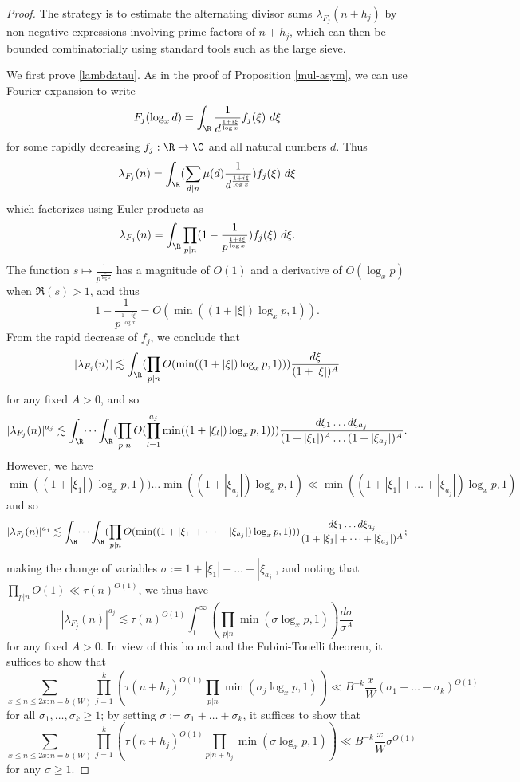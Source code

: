 \begin{proof}  The strategy is to estimate the alternating divisor sums $\lambda_{F_j}(n+h_j)$ by non-negative expressions involving prime factors of $n+h_j$, which can then be bounded combinatorially using standard tools such as the large sieve.

We first prove \eqref{lambdatau}.
As in the proof of Proposition \ref{mul-asym}, we can use Fourier expansion to write
$$ F_j( \log_x d ) = \int_\R \frac{1}{d^{\frac{1+i\xi}{\log x}}} f_j(\xi)\ d\xi$$
for some rapidly decreasing $f_j: \R \to \C$ and all natural numbers $d$.  Thus
$$ \lambda_{F_j}(n) = \int_\R (\sum_{d|n} \mu(d) \frac{1}{d^{\frac{1+i\xi}{\log x}}}) f_j(\xi)\ d\xi$$
which factorizes using Euler products as
$$ \lambda_{F_j}(n) = \int_\R \prod_{p|n} (1 - \frac{1}{p^{\frac{1+i\xi}{\log x}}}) f_j(\xi)\ d\xi.$$
The function $s \mapsto \frac{1}{p^{\frac{s}{\log x}}}$ has a magnitude of $O(1)$ and a derivative of $O( \log_x p )$ when $\Re(s) > 1$, and thus
$$ 1 - \frac{1}{p^{\frac{1+i\xi}{\log x}}} = O( \min( (1+|\xi|) \log_x p, 1) ).$$
From the rapid decrease of $f_j$, we conclude that
$$ |\lambda_{F_j}(n)| \lesssim \int_\R (\prod_{p|n} O( \min( (1+|\xi|) \log_x p, 1))) \frac{d\xi}{(1+|\xi|)^A}$$
for any fixed $A > 0$, and so
$$ |\lambda_{F_j}(n)|^{a_j} \lesssim \int_\R \dots \int_\R (\prod_{p|n} O( \prod_{l=1}^{a_j} \min( (1+|\xi_l|) \log_x p, 1))) \frac{d\xi_1 \dots d\xi_{a_j}}{(1+|\xi_1|)^A \dots (1+|\xi_{a_j}|)^A}.$$
However, we have
$$ \min( (1+|\xi_1|) \log_x p, 1)) \dots \min( (1+|\xi_{a_j}|) \log_x p, 1) \ll \min( (1+|\xi_1|+\dots+|\xi_{a_j}|) \log_x p, 1 )$$
and so
$$ |\lambda_{F_j}(n)|^{a_j} \lesssim \int_\R \dots \int_\R (\prod_{p|n} O( \min( (1+|\xi_1|+\dots+|\xi_{a_j}|) \log_x p, 1))) \frac{d\xi_1 \dots d \xi_{a_j}}{(1+|\xi_1|+\dots+|\xi_{a_j}|)^A};$$
making the change of variables $\sigma := 1+|\xi_1|+\dots+|\xi_{a_j}|$, and noting that $\prod_{p|n} O(1) \ll \tau(n)^{O(1)}$, we thus have
$$ |\lambda_{F_j}(n)|^{a_j} \lesssim \tau(n)^{O(1)} \int_1^\infty (\prod_{p|n} \min(\sigma \log_x p, 1)) \frac{d\sigma}{\sigma^A}$$
for any fixed $A>0$.  In view of this bound and the Fubini-Tonelli theorem, it suffices to show that
$$
\sum_{x \leq n \leq 2x: n = b\ (W)} \prod_{j=1}^k (\tau(n+h_j)^{O(1)} \prod_{p|n} \min(\sigma_j \log_x p,1)) \ll B^{-k} \frac{x}{W} (\sigma_1+\dots+\sigma_k)^{O(1)}$$
for all $\sigma_1,\dots,\sigma_k \geq 1$; by setting $\sigma := \sigma_1+\dots+\sigma_k$, it suffices to show that
\begin{equation}\label{xnx}
\sum_{x \leq n \leq 2x: n = b\ (W)} \prod_{j=1}^k (\tau(n+h_j)^{O(1)} \prod_{p|n+h_j} \min(\sigma \log_x p,1)) \ll B^{-k} \frac{x}{W} \sigma^{O(1)}
\end{equation}
for any $\sigma \geq 1$.


\end{proof}
